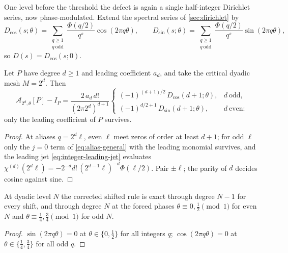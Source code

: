 One level before the threshold the defect is again a single
half-integer Dirichlet series, now phase-modulated.  Extend the
spectral series of \cref{sec:dirichlet} by
\begin{equation}
 D_{\cos}(s;\theta)
 =\sum_{\substack{q\ge1\\q\ \mathrm{odd}}}
 \frac{\Phi(q/2)}{q^{s}}\cos(2\pi q\theta),
 \qquad
 D_{\sin}(s;\theta)
 =\sum_{\substack{q\ge1\\q\ \mathrm{odd}}}
 \frac{\Phi(q/2)}{q^{s}}\sin(2\pi q\theta),
 \label{eq:D-phase}
\end{equation}
so $D(s)=D_{\cos}(s;0)$.

\begin{theorem}
\label{thm:F-first-defect}
Let $P$ have degree $d\ge1$ and leading coefficient $a_d$, and take the
critical dyadic mesh $M=2^{d}$.  Then
\begin{equation}
 \mathcal A_{2^{d},\theta}[P]-I_P
 =\frac{2\,a_d\,d!}{(2\pi 2^{d})^{d+1}}
 \begin{cases}
 (-1)^{(d+1)/2}\,D_{\cos}(d+1;\theta),&d\ \text{odd},\\[0.25em]
 (-1)^{d/2+1}\,D_{\sin}(d+1;\theta),&d\ \text{even}:
 \end{cases}
 \label{eq:F-first-defect}
\end{equation}
only the leading coefficient of $P$ survives.
\end{theorem}

\begin{proof}
At aliases $q=2^{d}\ell$, even $\ell$ meet zeros of order at least
$d+1$; for odd $\ell$ only the $j=0$ term of
\eqref{eq:alias-general} with the leading monomial survives, and the
leading jet \eqref{eq:integer-leading-jet} evaluates
$\chi^{(d)}(2^{d}\ell)=-2^{-d}d!\,(2^{d-1}\ell)^{-d}\Phi(\ell/2)$.
Pair $\pm\ell$; the parity of $d$ decides cosine against sine.
\end{proof}

\begin{corollary}
\label{cor:F-phases}
At dyadic level $N$ the corrected shifted rule is exact through degree
$N-1$ for every shift, and through degree $N$ at the forced phases
$\theta\equiv0,\tfrac12\pmod1$ for even $N$ and
$\theta\equiv\tfrac14,\tfrac34\pmod1$ for odd $N$.
\end{corollary}

\begin{proof}
$\sin(2\pi q\theta)=0$ at $\theta\in\{0,\tfrac12\}$ for all integers
$q$; $\cos(2\pi q\theta)=0$ at $\theta\in\{\tfrac14,\tfrac34\}$ for
all odd $q$.
\end{proof}


